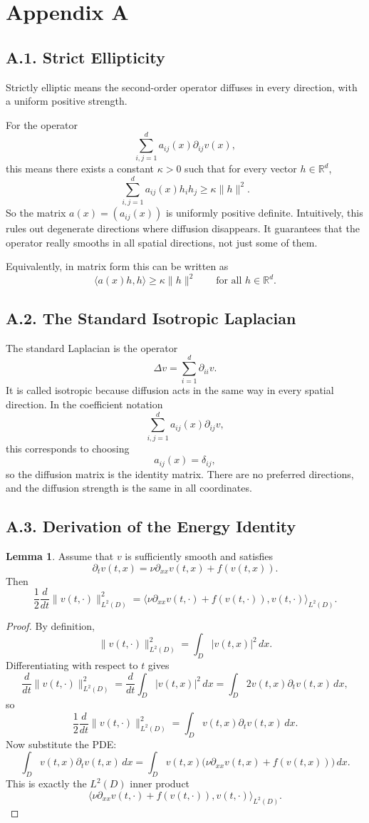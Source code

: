 \documentclass[11pt]{article}
\theoremstyle{definition}
\newtheorem{lemma}{Lemma}
\theoremstyle{remark}
\begin{document}
\appendix
\section*{Appendix A}

\subsection*{A.1. Strict Ellipticity}
Strictly elliptic means the second-order operator diffuses in every direction, with a uniform positive strength.

For the operator
\[
\sum_{i,j=1}^d a_{ij}(x)\partial_{ij}v(x),
\]
this means there exists a constant $\kappa>0$ such that for every vector $h\in\mathbb R^d$,
\[
\sum_{i,j=1}^d a_{ij}(x)h_i h_j \ge \kappa\|h\|^2.
\]
So the matrix $a(x)=(a_{ij}(x))$ is uniformly positive definite. Intuitively, this rules out degenerate directions where diffusion disappears. It guarantees that the operator really smooths in all spatial directions, not just some of them.

Equivalently, in matrix form this can be written as
\[
\langle a(x)h,h\rangle \ge \kappa\|h\|^2
\qquad\text{for all } h\in\mathbb R^d.
\]

\subsection*{A.2. The Standard Isotropic Laplacian}
The standard Laplacian is the operator
\[
\Delta v=\sum_{i=1}^d \partial_{ii}v.
\]
It is called isotropic because diffusion acts in the same way in every spatial direction. In the coefficient notation
\[
\sum_{i,j=1}^d a_{ij}(x)\partial_{ij}v,
\]
this corresponds to choosing
\[
a_{ij}(x)=\delta_{ij},
\]
so the diffusion matrix is the identity matrix. There are no preferred directions, and the diffusion strength is the same in all coordinates.

\subsection*{A.3. Derivation of the Energy Identity}
\begin{lemma}
Assume that $v$ is sufficiently smooth and satisfies
\[
\partial_t v(t,x)=\nu\partial_{xx}v(t,x)+f(v(t,x)).
\]
Then
\[
\frac12\frac{d}{dt}\|v(t,\cdot)\|_{L^2(D)}^2
=
\langle\nu\partial_{xx}v(t,\cdot)+f(v(t,\cdot)),v(t,\cdot)\rangle_{L^2(D)}.
\]
\end{lemma}

\begin{proof}
By definition,
\[
\|v(t,\cdot)\|_{L^2(D)}^2=\int_D |v(t,x)|^2\,dx.
\]
Differentiating with respect to $t$ gives
\[
\frac{d}{dt}\|v(t,\cdot)\|_{L^2(D)}^2
=
\frac{d}{dt}\int_D |v(t,x)|^2\,dx
=
\int_D 2v(t,x)\partial_t v(t,x)\,dx,
\]
so
\[
\frac12\frac{d}{dt}\|v(t,\cdot)\|_{L^2(D)}^2
=
\int_D v(t,x)\partial_t v(t,x)\,dx.
\]
Now substitute the PDE:
\[
\int_D v(t,x)\partial_t v(t,x)\,dx
=
\int_D v(t,x)\bigl(\nu\partial_{xx}v(t,x)+f(v(t,x))\bigr)\,dx.
\]
This is exactly the $L^2(D)$ inner product
\[
\langle\nu\partial_{xx}v(t,\cdot)+f(v(t,\cdot)),v(t,\cdot)\rangle_{L^2(D)}.
\]
\end{proof}
\end{document}
